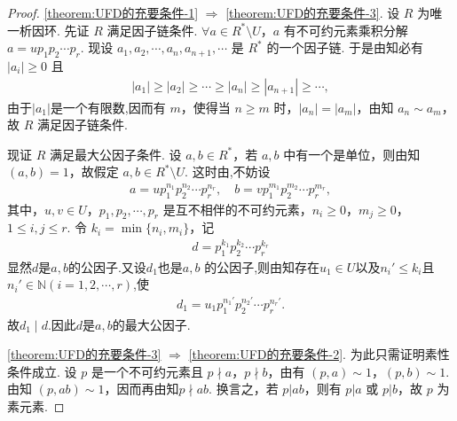 \documentclass[../../main.tex]{subfiles}%
\begin{document}
\begin{proof}

\ref{theorem:UFD的充要条件-1} \( \Rightarrow \) \ref{theorem:UFD的充要条件-3}. 设 \( R \) 为唯一析因环. 先证 \( R \) 满足因子链条件. \( \forall a \in R^* \setminus U \)，\( a \) 有不可约元素乘积分解 \( a = up_1p_2\cdots p_r \).
现设 \( a_1, a_2, \cdots, a_n, a_{n+1}, \cdots \) 是 \( R^* \) 的一个因子链. 于是由知必有 \( |a_i| \geqslant 0 \) 且
\begin{align*}
|a_1| \geqslant |a_2| \geqslant \cdots \geqslant |a_n| \geqslant |a_{n+1}| \geqslant \cdots,
\end{align*}
由于$|a_1|$是一个有限数,因而有 \( m \)，使得当 \( n \geqslant m \) 时，\( |a_n| = |a_m| \)，由知 \( a_n \sim a_m \)，故 \( R \) 满足因子链条件.

现证 \( R \) 满足最大公因子条件. 设 \( a, b \in R^* \)，若 \( a, b \) 中有一个是单位，则由知$(a,b)=1$，故假定 \( a, b \in R^* \setminus U \). 这时由,不妨设
\begin{gather*}
a = up_1^{n_1}p_2^{n_2}\cdots p_r^{n_r}, \quad
b = vp_1^{m_1}p_2^{m_2}\cdots p_r^{m_r}, 
\end{gather*}
其中，\( u, v \in U \)，\( p_1, p_2, \cdots, p_r \) 是互不相伴的不可约元素，\( n_i \geqslant 0 \)，\( m_j \geqslant 0 \)，\( 1 \leqslant i, j \leqslant r \). 令 \( k_i = \min\{n_i, m_i\} \)，记
\begin{align}
d = p_1^{k_1}p_2^{k_2}\cdots p_r^{k_r} \label{eq:2.4.6}
\end{align}
显然$d$是$a,b$的公因子.又设$d_1$也是\( a, b \) 的公因子,则由知存在$u_1\in U$以及$n_i'\leqslant k_i $且$n_i'\in \mathbb{N}(i=1,2,\cdots,r)$,使
\begin{align*}
d_1 = u_1p_1^{n_1'}p_2^{n_2'}\cdots p_r^{n_r'}.
\end{align*}
故$d_1\mid d$.因此$d$是$a,b$的最大公因子.

\ref{theorem:UFD的充要条件-3} \( \Rightarrow \) \ref{theorem:UFD的充要条件-2}. 为此只需证明素性条件成立. 设 \( p \) 是一个不可约元素且 \( p \nmid a \)，\( p \nmid b \)，由有 \( (p, a) \sim 1 \)，\( (p, b) \sim 1 \). 由知 \( (p, ab) \sim 1 \)，因而再由知\( p \nmid ab \). 换言之，若 \( p|ab \)，则有 \( p|a \) 或 \( p|b \)，故 \( p \) 为素元素.


\end{proof}
\end{document}

